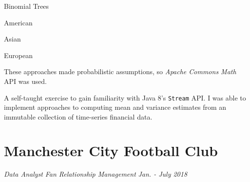 \documentclass[letterpaper,11pt]{article}
\newcommand{\resumeItem}[3]{
	\item\small{
		\textbf{#1}\hfill\tiny{#2\\}\small{ #3 \vspace{-2pt}}
	}
}
\newcommand{\resumeSubItem}[3]{\resumeItem{#1}{#2}{#3}\vspace{-2pt}}
\begin{document}
\begin{description}[style=multiline,leftmargin=3cm]
\begin{description}[style=multiline,leftmargin=2.85cm]
\begin{itemize*}
			            \item Binomial Trees
		            \end{itemize*}
		      \item[Payoff]
		            \begin{itemize*}
			            \item American
			            \item Asian
			            \item European
		            \end{itemize*}
	      \end{description}
	      These approaches made probabilistic assumptions, so \textit{Apache Commons Math} API was used.
	\item[Summarizing financial data \textnormal{\tiny
		      \href{https://adrian.ng/java/yahoofinance/\#stream}{adrian.ng/java/yahoofinance/\#stream}}]
	      A self-taught exercise to gain familiarity with Java 8's \texttt{Stream} API. I was able to implement approaches to computing mean and variance estimates from an immutable collection of time-series financial data.
\end{description}




\newpage
\section{Manchester City Football Club}
\textit{Data Analyst}
\hfill
\textit{Fan Relationship Management}
\hfill
\textit{Jan. - July 2018}
\end{document}
